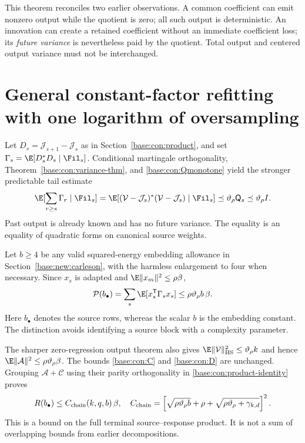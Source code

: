 \documentclass[11pt,oneside,openany,a4paper]{book}
\numberwithin{equation}{chapter}
\theoremstyle{definition}
\theoremstyle{remark}
\newcommand{\T}{\mathsf T}\newcommand{\Id}{I}
\begin{document}
This theorem reconciles two earlier observations. A common coefficient can emit nonzero output while the quotient is zero; all such output is deterministic. An innovation can create a retained coefficient without an immediate coefficient loss; its \emph{future variance} is nevertheless paid by the quotient. Total output and centered output variance must not be interchanged.

\section{General constant-factor refitting with one logarithm of oversampling}\label{base:con:oversampling}
Let $D_s=\mathcal J_{s+1}-\mathcal J_s$ as in Section~\ref{base:con:product}, and set
$\Gamma_s=\E[D_s^*D_s\mid\Fil_s]$. Conditional martingale orthogonality, Theorem~\ref{base:con:variance-thm}, and \eqref{base:con:Qmonotone} yield the stronger predictable tail estimate
\begin{equation}\label{base:con:predictable-tail}
 \E[\sum_{r\ge s}\Gamma_r\mid\Fil_s]
 =\E[(\mathcal V-\mathcal J_s)^*(\mathcal V-\mathcal J_s)\mid\Fil_s]
 \preceq\vartheta_\rho\mathsf Q_s\preceq\vartheta_\rho I.
\end{equation}
Past output is already known and has no future variance. The equality is an equality of quadratic forms on canonical source weights.

Let $b\ge4$ be any valid squared-energy embedding allowance in Section~\ref{base:new:carleson}, with the harmless enlargement to four when necessary. Since $x_s$ is adapted and $\E\|x_m\|^2\le\rho\beta$,
\begin{equation}\label{base:con:pred-bound}
 \mathcal P(b_{\bullet})=\sum_s\E[x_s^\T\Gamma_sx_s]
 \le\rho\vartheta_\rho b\,\beta.
\end{equation}
Here $b_{\bullet}$ denotes the source rows, whereas the scalar $b$ is the embedding constant. The distinction avoids identifying a source block with a complexity parameter.

The sharper zero-regression output theorem also gives
$\E\|\mathcal V\|_{\rm HS}^2\le\vartheta_\rho k$ and hence
$\E\|\mathcal A\|^2\le\rho\vartheta_\rho\beta$.
The bounds \eqref{base:con:C} and \eqref{base:con:D} are unchanged. Grouping $\mathcal A+\mathcal C$ using their parity orthogonality in \eqref{base:con:product-identity} proves
\begin{equation}\label{base:con:chain-current}
 R(b_{\bullet})\le C_{\rm chain}(k,q,b)\,\beta,
 \quad
 C_{\rm chain}=
 \left[\sqrt{\rho\vartheta_\rho b}+\rho+
 \sqrt{\rho\vartheta_\rho+\gamma_{k,d}}\right]^2.
\end{equation}
This is a bound on the full terminal source--response product. It is not a sum of overlapping bounds from earlier decompositions.
\end{document}

